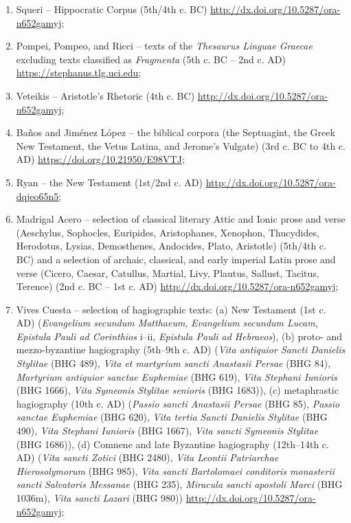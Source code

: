 \documentclass[output=paper,colorlinks,citecolor=brown]{langscibook}
\begin{document}
\begin{enumerate} 

\item	Squeri – Hippocratic Corpus (5th/4th c. BC) \url{http://dx.doi.org/10.5287/ora-n652gamyj};

\item Pompei, Pompeo, and Ricci – texts of the \textit{Thesaurus Linguae Graecae} excluding texts classified as \textit{Fragmenta} (5th c. BC – 2nd c. AD) \url{https://stephanus.tlg.uci.edu};

\item Veteikis – Aristotle’s Rhetoric (4th c. BC) \url{http://dx.doi.org/10.5287/ora-n652gamyj};


\item Baños and Jiménez López – the biblical corpora (the Septuagint, the Greek New Testament, the Vetus Latina, and Jerome’s Vulgate) (3rd c. BC to 4th c. AD) \url{https://doi.org/10.21950/E98VTJ};

\item Ryan – the New Testament (1st/2nd c. AD) \url{http://dx.doi.org/10.5287/ora-dqjeo65n5}; 

\item Madrigal Acero – selection of classical literary Attic and Ionic prose and verse (Aeschylus, Sophocles, Euripides, Aristophanes, Xenophon, Thucydides, Herodotus, Lysias, Demosthenes, Andocides, Plato, Aristotle) (5th/4th c. BC) and a selection of archaic, classical, and early imperial Latin prose and verse (Cicero, Caesar, Catullus, Martial, Livy, Plautus, Sallust, Tacitus, Terence) (2nd c. BC – 1st c. AD) \url{http://dx.doi.org/10.5287/ora-n652gamyj};


\item Vives Cuesta – selection of hagiographic texts: (a) New Testament (1st c. AD) (\textit{Evangelium secundum Matthaeum}, \textit{Evangelium secundum Lucam}, \textit{Epistula Pauli ad Corinthios} i–ii, \textit{Epistula Pauli ad Hebraeos}), (b) proto- and mezzo-byzantine hagiography (5th–9th c. AD) (\textit{Vita antiquior Sancti Danielis Stylitae} (BHG 489), \textit{Vita et martyrium sancti Anastasii Persae} (BHG 84), \textit{Martyrium antiquior sanctae Euphemiae} (BHG 619), \textit{Vita Stephani Iunioris} (BHG 1666), \textit{Vita Symeonis Stylitae senioris} (BHG 1683)), (c) metaphrastic hagiography (10th c. AD) (\textit{Passio sancti Anastasii Persae} (BHG 85), \textit{Passio sanctae Euphemiae} (BHG 620), \textit{Vita tertia Sancti Danielis Stylitae} (BHG 490), \textit{Vita Stephani Iunioris} (BHG 1667), \textit{Vita sancti Symeonis Stylitae} (BHG 1686)), (d) Comnene and late Byzantine hagiography (12th–14th c. AD) (\textit{Vita sancti Zotici} (BHG 2480), \textit{Vita Leontii Patriarchae Hierosolymorum} (BHG 985), \textit{Vita sancti Bartolomaei conditoris monasterii sancti Salvatoris Messanae} (BHG 235), \textit{Miracula sancti apostoli Marci} (BHG 1036m), \textit{Vita sancti Lazari} (BHG 980)) \url{http://dx.doi.org/10.5287/ora-n652gamyj};



\end{enumerate}
\end{document}
